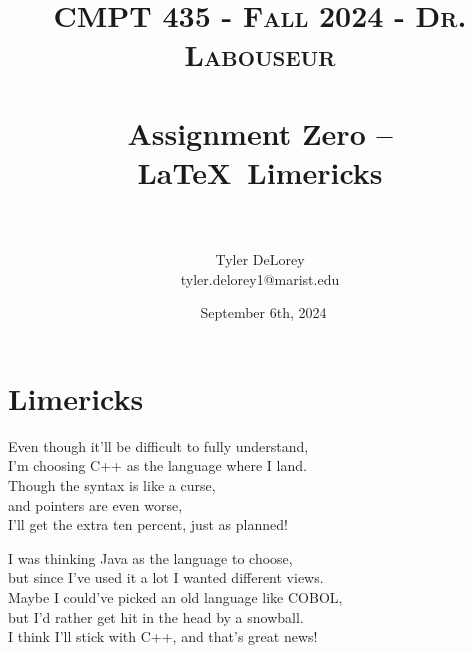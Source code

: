 \documentclass[letterpaper, 10pt]{article}
\title{	
   \normalfont \normalsize 
   \textsc{CMPT 435 - Fall 2024 - Dr. Labouseur} \\[10pt] %
   \horrule{0.5pt} \\[0.25cm] 	%
   \huge Assignment Zero -- \LaTeX ~Limericks \\     	    %
   \horrule{0.5pt} \\[0.25cm] 	%
}
\author{Tyler DeLorey \\ \normalsize tyler.delorey1@marist.edu}
\date{\normalsize\ September 6th, 2024}
\begin{document}
 
\maketitle %


\section{Limericks}

\noindent
Even though it'll be difficult to fully understand, \\
I'm choosing C++ as the language where I land. \\
   \hspace*{1.5em}Though the syntax is like a curse, \\
   \hspace*{1.5em}and pointers are even worse, \\
I'll get the extra ten percent, just as planned!

\vspace{4em}

\noindent
I was thinking Java as the language to choose, \\
but since I've used it a lot I wanted different views. \\
   \hspace*{1.5em}Maybe I could've picked an old language like COBOL, \\
   \hspace*{1.5em}but I'd rather get hit in the head by a snowball. \\
I think I'll stick with C++, and that's great news!
\end{document}
